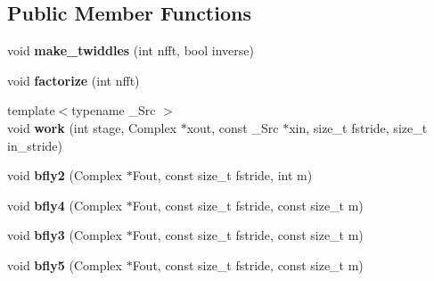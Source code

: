 \subsection*{Public Member Functions}
\begin{DoxyCompactItemize}
\item 
\mbox{\label{struct_eigen_1_1internal_1_1kiss__cpx__fft_a85cd6612b484e94c4b0ae3aaff4a3ca8}} 
void {\bfseries make\+\_\+twiddles} (int nfft, bool inverse)
\item 
\mbox{\label{struct_eigen_1_1internal_1_1kiss__cpx__fft_a61700af00cc2068ccc57003333a23ad1}} 
void {\bfseries factorize} (int nfft)
\item 
\mbox{\label{struct_eigen_1_1internal_1_1kiss__cpx__fft_a7ea71feb0d8704656596f2909dba9271}} 
{\footnotesize template$<$typename \+\_\+\+Src $>$ }\\void {\bfseries work} (int stage, Complex $\ast$xout, const \+\_\+\+Src $\ast$xin, size\+\_\+t fstride, size\+\_\+t in\+\_\+stride)
\item 
\mbox{\label{struct_eigen_1_1internal_1_1kiss__cpx__fft_a79580867cbe4b457c42b21745789b362}} 
void {\bfseries bfly2} (Complex $\ast$Fout, const size\+\_\+t fstride, int m)
\item 
\mbox{\label{struct_eigen_1_1internal_1_1kiss__cpx__fft_aa5c67750f3ced8773739a0ba964e2485}} 
void {\bfseries bfly4} (Complex $\ast$Fout, const size\+\_\+t fstride, const size\+\_\+t m)
\item 
\mbox{\label{struct_eigen_1_1internal_1_1kiss__cpx__fft_a91e8db66ee520362382a514b8784c307}} 
void {\bfseries bfly3} (Complex $\ast$Fout, const size\+\_\+t fstride, const size\+\_\+t m)
\item 
\mbox{\label{struct_eigen_1_1internal_1_1kiss__cpx__fft_a62690918301f7eb99af959474f7ea9d6}} 
void {\bfseries bfly5} (Complex $\ast$Fout, const size\+\_\+t fstride, const size\+\_\+t m)
\item 

\end{DoxyCompactItemize}
